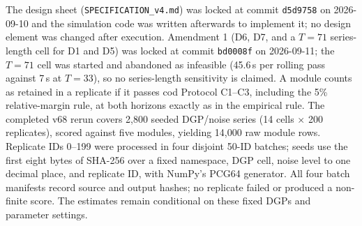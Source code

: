 \documentclass[preprint,11pt,authoryear]{elsarticle}
\theoremstyle{remark}
\begin{document}
The design sheet (\texttt{SPECIFICATION\_v4.md}) was locked at commit \texttt{d5d9758} on 2026-09-10 and the simulation code was written afterwards to implement it; no design element was changed after execution. Amendment 1 (D6, D7, and a $T=71$ series-length cell for D1 and D5) was locked at commit \texttt{bd0008f} on 2026-09-11; the $T=71$ cell was started and abandoned as infeasible (45.6\,s per rolling pass against 7\,s at $T=33$), so no series-length sensitivity is claimed. A module counts as retained in a replicate if it passes cod Protocol C1--C3, including the 5\% relative-margin rule, at both horizons exactly as in the empirical rule. The completed v68 rerun covers 2,800 seeded DGP/noise series (14 cells $\times$ 200 replicates), scored against five modules, yielding 14,000 raw module rows. Replicate IDs 0--199 were processed in four disjoint 50-ID batches; seeds use the first eight bytes of SHA-256 over a fixed namespace, DGP cell, noise level to one decimal place, and replicate ID, with NumPy's PCG64 generator. All four batch manifests record source and output hashes; no replicate failed or produced a non-finite score. The estimates remain conditional on these fixed DGPs and parameter settings.
\end{document}
